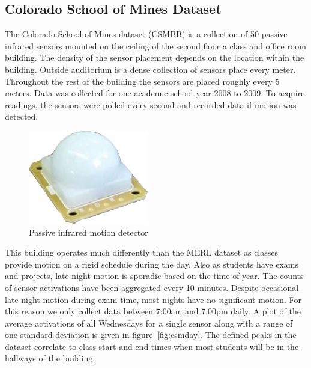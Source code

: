\documentclass{acm_proc_article-sp}
\begin{document}
\subsection{Colorado School of Mines Dataset}

The Colorado School of Mines dataset (CSMBB) is a collection of 50 passive infrared sensors mounted on the ceiling of the second floor a class and office room building.  The density of the sensor placement depends on the location within the building.  Outside auditorium is a dense collection of sensors place every meter.  Throughout the rest of the building the sensors are placed roughly every 5 meters.  Data was collected for one academic school year 2008 to 2009.  To acquire readings, the sensors were polled every second and recorded data if motion was detected.  

\begin{figure}[h]
\centering
\includegraphics[width = .4\linewidth]{pir_sensor.png}
\caption{Passive infrared motion detector}
\end{figure}

This building operates much differently than the MERL dataset as classes provide motion on a rigid schedule during the day.  Also as students have exams and projects, late night motion is sporadic based on the time of year.    The counts of sensor activations have been aggregated every 10 minutes.  Despite occasional late night motion during exam time, most nights have no significant motion.  For this reason we only collect data between 7:00am and 7:00pm daily.  A plot of the average activations of all Wednesdays for a single sensor along with a range of one standard deviation is given in figure~\ref{fig:csmday}.  The defined peaks in the dataset correlate to class start and end times when most students will be in the hallways of the building.
\end{document}
